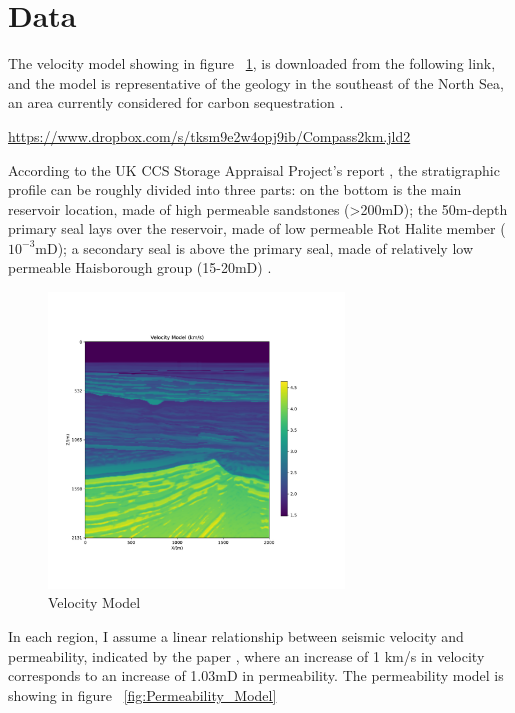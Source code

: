 \section{Data}

The velocity model showing in figure ~\ref{fig:Velocity_Model},
is downloaded from the following link, 
and the model is representative of the geology in the southeast of the North Sea, 
an area currently considered for carbon sequestration \citep{yin2021compressive}.

\href{https://www.dropbox.com/s/tksm9e2w4opj9ib/Compass2km.jld2}{https://www.dropbox.com/s/tksm9e2w4opj9ib/Compass2km.jld2}

According to the UK CCS Storage Appraisal Project's report \citep{UKreport2016},
the stratigraphic profile can be roughly divided into three parts:
on the bottom is the main reservoir location, made of high permeable sandstones (>200mD);
the 50m-depth primary seal lays over the reservoir, made of low permeable Rot Halite member ($10^{-3}$mD);
a secondary seal is above the primary seal, made of relatively low permeable Haisborough group (15-20mD) \citep{yin2021compressive}.

\begin{figure}[H]
    \centering
    \includegraphics[width=0.7\textwidth]{figures/project/Velocity_Model.pdf}
    \caption{Velocity Model}
    \label{fig:Velocity_Model}
\end{figure}

In each region, I assume a linear relationship between seismic velocity and permeability, 
indicated by the paper \citep{klimentos1991effects} , where an increase of 1 km/s in velocity corresponds to an increase of 1.03mD in permeability.
The permeability model is showing in figure ~\ref{fig:Permeability_Model}

